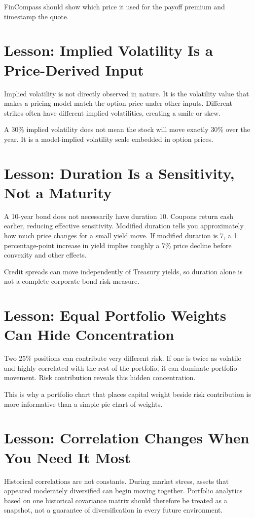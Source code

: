 \documentclass[11pt]{article}
\begin{document}
FinCompass should show which price it used for the payoff premium and timestamp the quote.

\section{Lesson: Implied Volatility Is a Price-Derived Input}
Implied volatility is not directly observed in nature. It is the volatility value that makes a pricing model match the option price under other inputs. Different strikes often have different implied volatilities, creating a smile or skew.

A 30\% implied volatility does not mean the stock will move exactly 30\% over the year. It is a model-implied volatility scale embedded in option prices.

\section{Lesson: Duration Is a Sensitivity, Not a Maturity}
A 10-year bond does not necessarily have duration 10. Coupons return cash earlier, reducing effective sensitivity. Modified duration tells you approximately how much price changes for a small yield move. If modified duration is 7, a 1 percentage-point increase in yield implies roughly a 7\% price decline before convexity and other effects.

Credit spreads can move independently of Treasury yields, so duration alone is not a complete corporate-bond risk measure.

\section{Lesson: Equal Portfolio Weights Can Hide Concentration}
Two 25\% positions can contribute very different risk. If one is twice as volatile and highly correlated with the rest of the portfolio, it can dominate portfolio movement. Risk contribution reveals this hidden concentration.

This is why a portfolio chart that places capital weight beside risk contribution is more informative than a simple pie chart of weights.

\section{Lesson: Correlation Changes When You Need It Most}
Historical correlations are not constants. During market stress, assets that appeared moderately diversified can begin moving together. Portfolio analytics based on one historical covariance matrix should therefore be treated as a snapshot, not a guarantee of diversification in every future environment.
\end{document}
